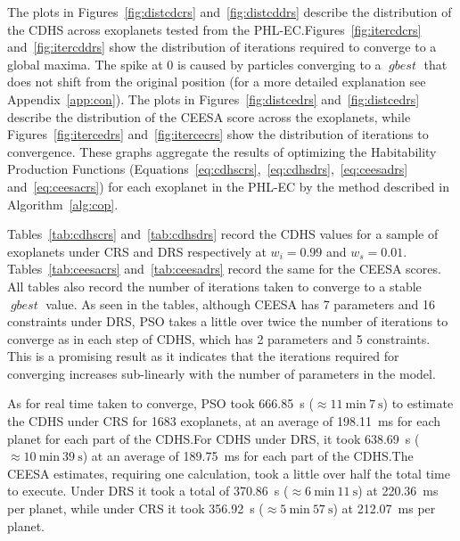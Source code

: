\documentclass[10pt,draft]{article}
\DeclareMathOperator*{\gbest}{\mathit{gbest}}
\begin{document}
The plots in Figures~\ref{fig:distcdcrs} and~\ref{fig:distcddrs} describe the distribution of the CDHS across exoplanets
tested from the PHL-EC.\@ Figures~\ref{fig:itercdcrs} and~\ref{fig:itercddrs} show the distribution of iterations
required to converge to a global maxima. The spike at 0 is caused by particles converging to a $\gbest$ that does not
shift from the original position (for a more detailed explanation see Appendix~\ref{app:con}). The plots in
Figures~\ref{fig:distcedrs} and~\ref{fig:distcedrs} describe the distribution of the CEESA score across the exoplanets,
while Figures~\ref{fig:itercedrs} and~\ref{fig:itercecrs} show the distribution of iterations to convergence. These
graphs aggregate the results of optimizing the Habitability Production Functions
(Equations~\ref{eq:cdhscrs},~\ref{eq:cdhsdrs},~\ref{eq:ceesadrs} and~\ref{eq:ceesacrs}) for each exoplanet in the PHL-EC
by the method described in Algorithm~\ref{alg:cop}.

Tables~\ref{tab:cdhscrs} and~\ref{tab:cdhsdrs} record the CDHS values for a sample of exoplanets under CRS and DRS
respectively at $w_i=0.99$ and $w_s=0.01$. Tables~\ref{tab:ceesacrs} and~\ref{tab:ceesadrs} record the same for the
CEESA scores. All tables also record the number of iterations taken to converge to a stable $\gbest$ value. As seen in
the tables, although CEESA has 7 parameters and 16 constraints under DRS, PSO takes a little over twice the number of
iterations to converge as in each step of CDHS, which has 2 parameters and 5 constraints. This is a promising result as
it indicates that the iterations required for converging increases sub-linearly with the number of parameters in the
model.

As for real time taken to converge, PSO took \SI{666.85}{\second} ($\approx\SI{11}{\minute}\ \SI{7}{\second}$) to
estimate the CDHS under CRS for \num{1683} exoplanets, at an average of \SI{198.11}{\milli\second} for each planet for
each part of the CDHS.\@ For CDHS under DRS, it took \SI{638.69}{\second} ($\approx\SI{10}{\minute}\ \SI{39}{\second}$)
at an average of \SI{189.75}{\milli\second} for each part of the CDHS.\@ The CEESA estimates, requiring one calculation,
took a little over half the total time to execute. Under DRS it took a total of \SI{370.86}{\second}
($\approx\SI{6}{\minute}\ \SI{11}{\second}$) at \SI{220.36}{\milli\second} per planet, while under CRS it took
\SI{356.92}{\second} ($\approx\SI{5}{\minute}\ \SI{57}{\second}$) at \SI{212.07}{\milli\second} per planet.
\end{document}
